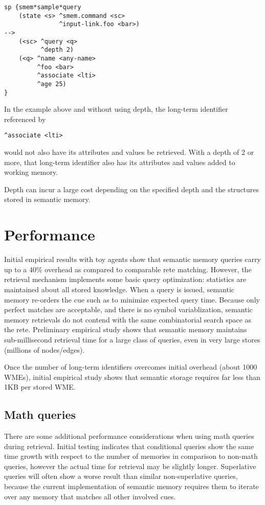 \begin{verbatim}
sp {smem*sample*query
    (state <s> ^smem.command <sc>
               ^input-link.foo <bar>)
-->
    (<sc> ^query <q>
          ^depth 2)
    (<q> ^name <any-name>
         ^foo <bar>
         ^associate <lti>
         ^age 25)
}
\end{verbatim}

In the example above and without using depth, the long-term identifier referenced by
\begin{verbatim}
^associate <lti>
\end{verbatim}
would not also have its attributes and values be retrieved. With a depth of 2 or more, that long-term identifier also has its attributes and values added to working memory.

Depth can incur a large cost depending on the specified depth and the structures stored in semantic memory.

\section{Performance}
\label{SMEM-perf}

Initial empirical results with toy agents show that semantic memory queries carry up to a 40\% overhead as compared to comparable rete matching.  
However, the retrieval mechanism implements some basic query optimization: statistics are maintained about all stored knowledge.  
When a query is issued, semantic memory re-orders the cue such as to minimize expected query time.  
Because only perfect matches are acceptable, and there is no symbol variablization, semantic memory retrievals do not contend with the same combinatorial search space as the rete.  
Preliminary empirical study shows that semantic memory maintains sub-millisecond retrieval time for a large class of queries, even in very large stores (millions of nodes/edges).

Once the number of long-term identifiers overcomes initial overhead (about 1000 WMEs), initial empirical study shows that semantic storage requires far less than 1KB per stored WME.

\subsection{Math queries}
There are some additional performance considerations when using math queries during retrieval.
Initial testing indicates that conditional queries show the same time growth with respect to the number of memories in comparison to non-math queries, however the actual time for retrieval may be slightly longer.
Superlative queries will often show a worse result than similar non-superlative queries, because the current implementation of semantic memory requires them to iterate over any memory that matches all other involved cues.

